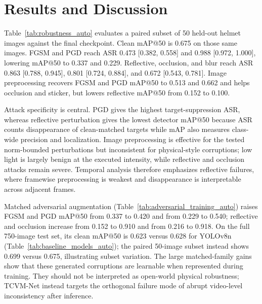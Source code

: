 \documentclass[runningheads,a4paper]{llncs}
\newcommand{\method}{TCVM-Net}
\begin{document}

\section{Results and Discussion}

Table~\ref{tab:robustness_auto} evaluates a paired subset of 50 held-out helmet images against the final checkpoint. Clean mAP@50 is 0.675 on those same images. FGSM and PGD reach ASR 0.473 [0.382, 0.558] and 0.988 [0.972, 1.000], lowering mAP@50 to 0.337 and 0.229. Reflective, occlusion, and blur reach ASR 0.863 [0.788, 0.945], 0.801 [0.724, 0.884], and 0.672 [0.543, 0.781]. Image preprocessing recovers FGSM and PGD mAP@50 to 0.513 and 0.662 and helps occlusion and sticker, but lowers reflective mAP@50 from 0.152 to 0.100.


Attack specificity is central. PGD gives the highest target-suppression ASR, whereas reflective perturbation gives the lowest detector mAP@50 because ASR counts disappearance of clean-matched targets while mAP also measures class-wide precision and localization. Image preprocessing is effective for the tested norm-bounded perturbations but inconsistent for physical-style corruptions; low light is largely benign at the executed intensity, while reflective and occlusion attacks remain severe. Temporal analysis therefore emphasizes reflective failures, where framewise preprocessing is weakest and disappearance is interpretable across adjacent frames.

Matched adversarial augmentation (Table~\ref{tab:adversarial_training_auto}) raises FGSM and PGD mAP@50 from 0.337 to 0.420 and from 0.229 to 0.540; reflective and occlusion increase from 0.152 to 0.910 and from 0.216 to 0.918. On the full 750-image test set, its clean mAP@50 is 0.623 versus 0.628 for YOLOv8n (Table~\ref{tab:baseline_models_auto}); the paired 50-image subset instead shows 0.699 versus 0.675, illustrating subset variation. The large matched-family gains show that these generated corruptions are learnable when represented during training. They should not be interpreted as open-world physical robustness; \method{} instead targets the orthogonal failure mode of abrupt video-level inconsistency after inference.
\end{document}
